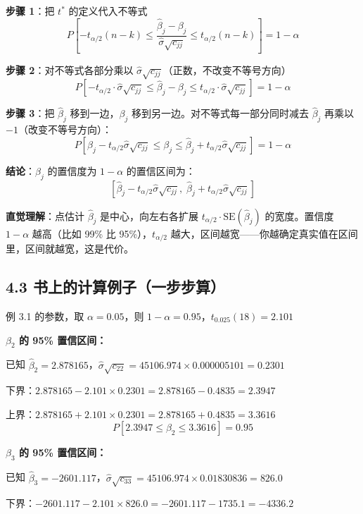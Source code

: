 \documentclass[12pt,a4paper]{ctexart}
\begin{document}
\textbf{步骤 1}：把 \(t^*\) 的定义代入不等式
\[
P\left[-t_{\alpha/2}(n-k) \leq \frac{\hat{\beta}_j - \beta_j}{\hat{\sigma}\sqrt{c_{jj}}} \leq t_{\alpha/2}(n-k)\right] = 1 - \alpha
\]

\textbf{步骤 2}：对不等式各部分乘以 \(\hat{\sigma}\sqrt{c_{jj}}\)（正数，不改变不等号方向）
\[
P\left[-t_{\alpha/2} \cdot \hat{\sigma}\sqrt{c_{jj}} \leq \hat{\beta}_j - \beta_j \leq t_{\alpha/2} \cdot \hat{\sigma}\sqrt{c_{jj}}\right] = 1 - \alpha
\]

\textbf{步骤 3}：把 \(\hat{\beta}_j\) 移到一边，\(\beta_j\) 移到另一边。对不等式每一部分同时减去 \(\hat{\beta}_j\) 再乘以 \(-1\)（改变不等号方向）：
\begin{equation}
P\left[\hat{\beta}_j - t_{\alpha/2}\hat{\sigma}\sqrt{c_{jj}} \leq \beta_j \leq \hat{\beta}_j + t_{\alpha/2}\hat{\sigma}\sqrt{c_{jj}}\right] = 1 - \alpha \tag{3.54}
\end{equation}

\textbf{结论}：\(\beta_j\) 的置信度为 \(1 - \alpha\) 的置信区间为：
\[
[\hat{\beta}_j - t_{\alpha/2}\hat{\sigma}\sqrt{c_{jj}},\; \hat{\beta}_j + t_{\alpha/2}\hat{\sigma}\sqrt{c_{jj}}]
\]

\textbf{直觉理解}：点估计 \(\hat{\beta}_j\) 是中心，向左右各扩展 \(t_{\alpha/2} \cdot \mathrm{SE}(\hat{\beta}_j)\) 的宽度。置信度 \(1-\alpha\) 越高（比如 99\% 比 95\%），\(t_{\alpha/2}\) 越大，区间越宽——你越确定真实值在区间里，区间就越宽，这是代价。

\subsection{4.3 书上的计算例子（一步步算）}

例 3.1 的参数，取 \(\alpha = 0.05\)，则 \(1 - \alpha = 0.95\)，\(t_{0.025}(18) = 2.101\)

\textbf{\(\beta_2\) 的 95\% 置信区间：}

已知 \(\hat{\beta}_2 = 2.878165\)，\(\hat{\sigma}\sqrt{c_{22}} = 45106.974 \times 0.000005101 = 0.2301\)

下界：\(2.878165 - 2.101 \times 0.2301 = 2.878165 - 0.4835 = 2.3947\)

上界：\(2.878165 + 2.101 \times 0.2301 = 2.878165 + 0.4835 = 3.3616\)
\[
P[2.3947 \leq \beta_2 \leq 3.3616] = 0.95
\]

\textbf{\(\beta_3\) 的 95\% 置信区间：}

已知 \(\hat{\beta}_3 = -2601.117\)，\(\hat{\sigma}\sqrt{c_{33}} = 45106.974 \times 0.01830836 = 826.0\)

下界：\(-2601.117 - 2.101 \times 826.0 = -2601.117 - 1735.1 = -4336.2\)
\end{document}
